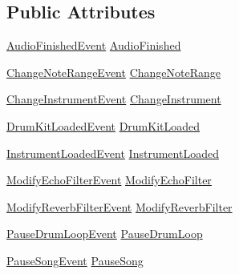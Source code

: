\subsection*{Public Attributes}
\begin{DoxyCompactItemize}
\item 
\hyperlink{group___v_i_m_event_types_class_virtual_instrument_manager_1_1_audio_finished_event}{Audio\+Finished\+Event} \hyperlink{group___v_i_m_events_ga39ffa8215ab5c9ad46c563e2bd87c219}{Audio\+Finished}
\item 
\hyperlink{group___v_i_m_event_types_class_virtual_instrument_manager_1_1_change_note_range_event}{Change\+Note\+Range\+Event} \hyperlink{group___v_i_m_events_gab6fa99d08e8466406835b9fc4ff859f1}{Change\+Note\+Range}
\item 
\hyperlink{group___v_i_m_event_types_class_virtual_instrument_manager_1_1_change_instrument_event}{Change\+Instrument\+Event} \hyperlink{group___v_i_m_events_ga1b9f12a73a5418ea5695d38b78c506c4}{Change\+Instrument}
\item 
\hyperlink{group___v_i_m_event_types_class_virtual_instrument_manager_1_1_drum_kit_loaded_event}{Drum\+Kit\+Loaded\+Event} \hyperlink{group___v_i_m_events_ga2dea060b2fba524166433300113dc281}{Drum\+Kit\+Loaded}
\item 
\hyperlink{group___v_i_m_event_types_class_virtual_instrument_manager_1_1_instrument_loaded_event}{Instrument\+Loaded\+Event} \hyperlink{group___v_i_m_events_gad79b789b020d7e4a8c149ec653c0b97f}{Instrument\+Loaded}
\item 
\hyperlink{group___v_i_m_event_types_class_virtual_instrument_manager_1_1_modify_echo_filter_event}{Modify\+Echo\+Filter\+Event} \hyperlink{group___v_i_m_events_ga112ed15f48fd261f1ad71c3c953c0a58}{Modify\+Echo\+Filter}
\item 
\hyperlink{group___v_i_m_event_types_class_virtual_instrument_manager_1_1_modify_reverb_filter_event}{Modify\+Reverb\+Filter\+Event} \hyperlink{group___v_i_m_events_gaadd137e073cb3849f610a46e0d032858}{Modify\+Reverb\+Filter}
\item 
\hyperlink{group___v_i_m_event_types_class_virtual_instrument_manager_1_1_pause_drum_loop_event}{Pause\+Drum\+Loop\+Event} \hyperlink{group___v_i_m_events_ga6de00a430321852cc3c8c4a213d62c70}{Pause\+Drum\+Loop}
\item 
\hyperlink{group___v_i_m_event_types_class_virtual_instrument_manager_1_1_pause_song_event}{Pause\+Song\+Event} \hyperlink{group___v_i_m_events_gae2d76fc98161d7a4573628dbd93e7887}{Pause\+Song}
\item 

\end{DoxyCompactItemize}
